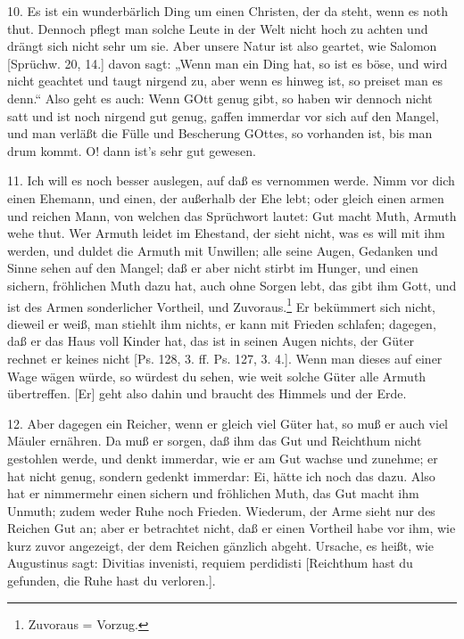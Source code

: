 10. Es ist ein wunderbärlich Ding um einen Christen, der da steht, wenn es noth thut. Dennoch pflegt man solche Leute in der Welt nicht hoch zu achten und drängt sich nicht sehr um sie. Aber unsere Natur ist also geartet, wie Salomon [Sprüchw. 20, 14.] davon sagt: „Wenn man ein Ding hat, so ist es böse, und wird nicht geachtet und taugt nirgend zu, aber wenn es hinweg ist, so preiset man es denn.“ Also geht es auch: Wenn GOtt genug gibt, so haben wir dennoch nicht satt und ist noch nirgend gut genug, gaffen immerdar vor sich auf den Mangel, und man verläßt die Fülle und Bescherung GOttes, so vorhanden ist, bis man drum kommt. O! dann ist’s sehr gut gewesen.

11. Ich will es noch besser auslegen, auf daß es vernommen werde. Nimm vor dich einen Ehemann, und einen, der außerhalb der Ehe lebt; oder gleich einen armen und reichen Mann, von welchen das Sprüchwort lautet: Gut macht Muth, Armuth wehe thut. Wer Armuth leidet im Ehestand, der sieht nicht, was es will mit ihm werden, und duldet die Armuth mit Unwillen; alle seine Augen, Gedanken und Sinne sehen auf den Mangel; daß er aber nicht stirbt im Hunger, und einen sichern, fröhlichen Muth dazu hat, auch ohne Sorgen lebt, das gibt ihm
Gott, und ist des Armen sonderlicher Vortheil, und Zuvoraus.\footnote{Zuvoraus = Vorzug.} Er bekümmert sich nicht, dieweil er weiß, man stiehlt ihm nichts, er kann mit Frieden schlafen; dagegen, daß er das Haus voll Kinder hat, das ist in seinen Augen nichts, der Güter rechnet er keines nicht [Ps. 128, 3. ff. Ps. 127, 3. 4.]. Wenn man dieses auf einer Wage wägen würde, so würdest du sehen, wie weit solche Güter alle Armuth übertreffen. [Er] geht also dahin und braucht des Himmels und der Erde.

12. Aber dagegen ein Reicher, wenn er gleich viel Güter hat, so muß er auch viel Mäuler ernähren. Da muß er sorgen, daß ihm das Gut und Reichthum nicht gestohlen werde, und denkt immerdar, wie er am Gut wachse und zunehme; er hat nicht genug, sondern gedenkt immerdar: Ei, hätte ich noch das dazu. Also hat er nimmermehr einen sichern und fröhlichen Muth, das Gut macht ihm Unmuth; zudem weder Ruhe noch Frieden. Wiederum, der Arme sieht nur des Reichen Gut an; aber er betrachtet nicht, daß er einen Vortheil habe vor ihm, wie kurz zuvor angezeigt, der dem Reichen gänzlich abgeht. Ursache, es heißt, wie Augustinus sagt: Divitias invenisti, requiem perdidisti [Reichthum hast du gefunden, die Ruhe hast du verloren.].

